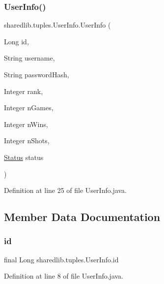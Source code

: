 \subsubsection{\texorpdfstring{User\+Info()}{UserInfo()}\hspace{0.1cm}{\footnotesize\ttfamily [3/3]}}
{\footnotesize\ttfamily sharedlib.\+tuples.\+User\+Info.\+User\+Info (\begin{DoxyParamCaption}\item[{Long}]{id,  }\item[{String}]{username,  }\item[{String}]{password\+Hash,  }\item[{Integer}]{rank,  }\item[{Integer}]{n\+Games,  }\item[{Integer}]{n\+Wins,  }\item[{Integer}]{n\+Shots,  }\item[{\hyperlink{enumsharedlib_1_1tuples_1_1_user_info_1_1_status}{Status}}]{status }\end{DoxyParamCaption})}



Definition at line 25 of file User\+Info.\+java.



\subsection{Member Data Documentation}
\hypertarget{classsharedlib_1_1tuples_1_1_user_info_a718f94d7bb86f3c19dd7ae911b4dfca3}{}\label{classsharedlib_1_1tuples_1_1_user_info_a718f94d7bb86f3c19dd7ae911b4dfca3} 
\subsubsection{\texorpdfstring{id}{id}}
{\footnotesize\ttfamily final Long sharedlib.\+tuples.\+User\+Info.\+id}



Definition at line 8 of file User\+Info.\+java.

\hypertarget{classsharedlib_1_1tuples_1_1_user_info_aed7cc749f766225615c61ae3d22063d9}{}\label{classsharedlib_1_1tuples_1_1_user_info_aed7cc749f766225615c61ae3d22063d9} 
